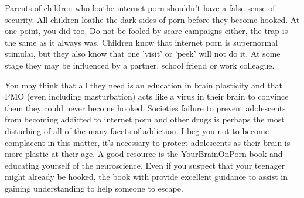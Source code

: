 \documentclass[easypeasy]{subfiles}
\begin{document}
Parents of children who loathe internet porn shouldn't have a false sense of security. All children loathe the dark sides of porn before they become hooked. At one point, you did too. Do not be fooled by scare campaigns either, the trap is the same as it always was. Children know that internet porn is supernormal stimulai, but they also know that one 'visit' or 'peek' will not do it. At some stage they may be influenced by a partner, school friend or work colleague.

You may think that all they need is an education in brain plasticity and that PMO (even including masturbation) acts like a virus in their brain to convince them they could never become hooked. Societies failure to prevent adolescents from becoming addicted to internet porn and other drugs is perhaps the most disturbing of all of the many facets of addiction. I beg you not to become complacent in this matter, it's necessary to protect adolescents as their brain is more plastic at their age. A good resource is the YourBrainOnPorn book and educating yourself of the neuroscience. Even if you suspect that your teenager might already be hooked, the book with provide excellent guidance to assist in gaining understanding to help someone to escape.
\end{document}
